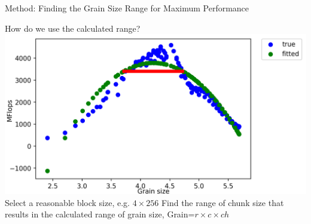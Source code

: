 \documentclass[10pt]{beamer}
\begin{document}

\begin{frame}{Method: Finding the Grain Size Range for Maximum Performance}
	\begin{outline}
	How do we use the calculated range?
	\includegraphics[scale=.3]{images/polyfit/fig_690_total_8_range.png}
	\1Select a reasonable block size, e.g. $4\times256$
	\1Find the range of chunk size that results in the calculated range of grain size, Grain=$r\times{c}\times{ch}$
	\end{outline}
\end{frame}
\end{document}

